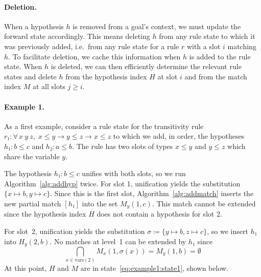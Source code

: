 \documentclass[runningheads,leqno]{llncs}
\newcommand{\para}[1]{\paragraph{\bfseries\upshape #1}}
\newcommand{\All}[2]{\ensuremath{\forall\, #1,\; #2}}
\newcommand{\vars}{\ensuremath{\mathrm{vars}}}
\begin{document}
\para{Deletion.}
When a hypothesis $h$ is removed from a goal's context, we must update the forward state accordingly.
This means deleting $h$ from any rule state to which it was previously added, i.e.\ from any rule state for a rule $r$ with a slot $i$ matching $h$.
To facilitate deletion, we cache this information when $h$ is added to the rule state.
When $h$ is deleted, we can then efficiently determine the relevant rule states and delete $h$ from the hypothesis index $H$ at slot $i$ and from the match index $M$ at all slots $j ≥ i$.

\para{Example 1.}
As a first example, consider a rule state for the transitivity rule $r₁ : \All{x~y~z}{x ≤ y → y ≤ z → x ≤ z}$ to which we add, in order, the hypotheses
$h₁ : b ≤ c$ and $h₂ : a ≤ b$.
The rule has two slots of types $x ≤ y$ and $y ≤ z$ which share the variable $y$.

The hypothesis $h₁ : b ≤ c$ unifies with both slots, so we run Algorithm~\ref{alg:addhyp} twice.
For slot 1, unification yields the substitution $\{x ↦ b, y ↦ c\}$.
Since this is the first slot, Algorithm~\ref{alg:addmatch} inserts the new partial match $[h₁]$ into the set $M_{y}(1, c)$.
This match cannot be extended since the hypothesis index $H$ does not contain a hypothesis for slot 2.

For slot~2, unification yields the substitution $σ ≔ \{y ↦ b, z ↦ c\}$, so we insert $h₁$ into $H_{y}(2, b)$.
No matches at level~1 can be extended by $h₁$ since
\[
  \bigcap_{x \in \vars(2)} M_{x}(1, σ(x)) = M_{y}(1, b) = \emptyset
\]
At this point, $H$ and $M$ are in state~\eqref{eq:example1:state1}, shown below.
\end{document}
